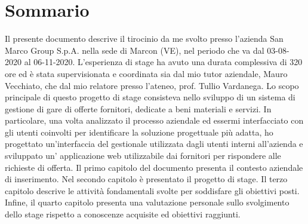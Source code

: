 
\cleardoublepage
{}
{}
\begingroup
\let\clearpage\relax
\let\cleardoublepage\relax
\let\cleardoublepage\relax

\chapter*{Sommario}

Il presente documento descrive il tirocinio da me svolto presso l'azienda San Marco Group S.p.A. nella sede di Marcon (VE), nel periodo che va dal 03-08-2020 al 06-11-2020. L'esperienza di stage ha avuto una durata complessiva di 320 ore ed è stata supervisionata e coordinata sia dal mio tutor aziendale, Mauro Vecchiato, che dal mio relatore presso l'ateneo, prof. Tullio Vardanega. Lo scopo principale di questo progetto di stage consisteva nello sviluppo di un sistema di gestione di gare di offerte fornitori, dedicate a beni materiali e servizi. In particolare, una volta analizzato il processo aziendale ed essermi interfacciato con gli utenti coinvolti per identificare la soluzione progettuale più adatta, ho progettato un'interfaccia del gestionale utilizzata dagli utenti interni all'azienda e sviluppato un' applicazione web utilizzabile dai fornitori per rispondere alle richieste di offerta. 
Il primo capitolo del documento presenta il contesto aziendale di inserimento.  
Nel secondo capitolo è presentato il progetto di stage.  
Il terzo capitolo descrive le attività fondamentali svolte per soddisfare gli obiettivi posti.  
Infine, il quarto capitolo presenta una valutazione personale sullo svolgimento dello stage rispetto a conoscenze acquisite ed obiettivi raggiunti.

%
%

\endgroup			

\vfill

